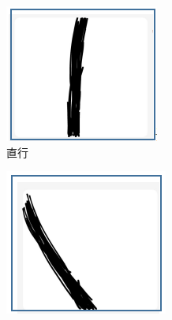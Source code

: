 \documentclass{paper}
\begin{document}
\begin{figure}[ht]
  \centering
  \caption{经过灰阶化-二值化的图像}
   \begin{subfigure}[b]{0.3\textwidth}
     \centering
     \includegraphics[width=\textwidth]{figures/straight.png}
     \caption{直行}
     \label{fig:label}
   \end{subfigure}
   \hfill
 \begin{subfigure}[b]{0.3\textwidth}
   \centering
   \includegraphics[width=\textwidth]{figures/left.png}

\end{subfigure}
\end{figure}
\end{document}
